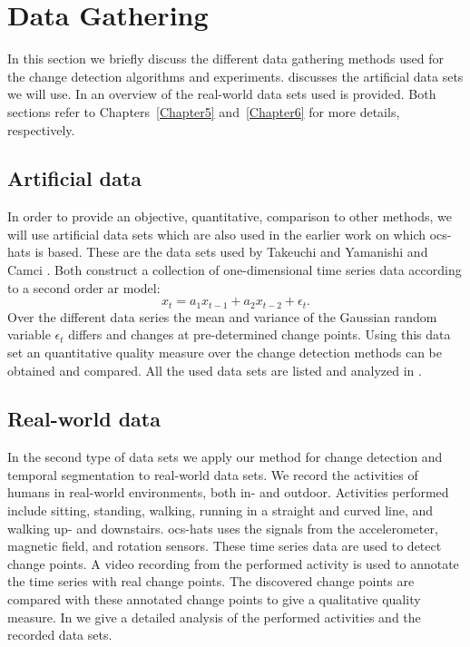 \section{Data Gathering}\label{sec:method_data_gathering}
In this section we briefly discuss the different data gathering methods used for the change detection algorithms and experiments.
 discusses the artificial data sets we will use.
In  an overview of the real-world data sets used is provided.
Both sections refer to Chapters~\ref{Chapter5} and~\ref{Chapter6} for more details, respectively.

\subsection{Artificial data}\label{subsec:data_gathering_artificial}
In order to provide an objective, quantitative, comparison to other methods, we will use artificial data sets which are also used in the earlier work on which \gls{ocs-hats} is based.
These are the data sets used by Takeuchi and Yamanishi \cite{takeuchi2006unifying} and Camci \cite{camci2010change}.
Both construct a collection of one-dimensional time series data according to a second order \gls{ar} model:
\begin{equation}
  x_t = a_1 x_{t-1} + a_2 x_{t-2} + \epsilon_t.
\end{equation}
Over the different data series the mean and variance of the Gaussian random variable $\epsilon_t$ differs and changes at pre-determined change points.
Using this data set an quantitative quality measure over the change detection methods can be obtained and compared.
All the used data sets are listed and analyzed in .

\subsection{Real-world data}\label{subsec:data_gathering_real_world}
In the second type of data sets we apply our method for change detection and temporal segmentation to real-world data sets.
We record the activities of humans in real-world environments, both in- and outdoor.
Activities performed include sitting, standing, walking, running in a straight and curved line, and walking up- and downstairs.
\gls{ocs-hats} uses the signals from the accelerometer, magnetic field, and rotation sensors.
These time series data are used to detect change points.
A video recording from the performed activity is used to annotate the time series with real change points.
The discovered change points are compared with these annotated change points to give a qualitative quality measure.
In  we give a detailed analysis of the performed activities and the recorded data sets.

